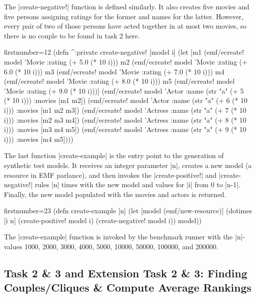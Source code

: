 \documentclass[a4paper]{article}
\newcommand{\code}{\clojureinline}
\begin{document}
The \code|create-negative!| function is defined similarly.  It also creates
five movies and five persons assigning ratings for the former and names for the
latter.  However, every pair of two of those persons have acted together in at
most two movies, so there is no couple to be found in task 2 here.

\begin{clojurecode*}{firstnumber=12}
(defn ^:private create-negative! [model i]
  (let [m1 (emf/ecreate! model 'Movie :rating (+ 5.0 (* 10 i)))
        m2 (emf/ecreate! model 'Movie :rating (+ 6.0 (* 10 i)))
        m3 (emf/ecreate! model 'Movie :rating (+ 7.0 (* 10 i)))
        m4 (emf/ecreate! model 'Movie :rating (+ 8.0 (* 10 i)))
        m5 (emf/ecreate! model 'Movie :rating (+ 9.0 (* 10 i)))]
    (emf/ecreate! model 'Actor   :name (str "a" (+ 5 (* 10 i))) :movies [m1 m2])
    (emf/ecreate! model 'Actor   :name (str "a" (+ 6 (* 10 i))) :movies [m1 m2 m3])
    (emf/ecreate! model 'Actress :name (str "a" (+ 7 (* 10 i))) :movies [m2 m3 m4])
    (emf/ecreate! model 'Actress :name (str "a" (+ 8 (* 10 i))) :movies [m3 m4 m5])
    (emf/ecreate! model 'Actress :name (str "a" (+ 9 (* 10 i))) :movies [m4 m5])))
\end{clojurecode*}

The last function \code|create-example| is the entry point to the generation of
synthetic test models.  It receives an integer parameter \code|n|, creates a
new model (a resource in EMF parlance), and then invokes the
\code|create-positive!| and \code|create-negative!| rules \code|n| times with
the new model and values for \code|i| from 0 to \code|n-1|.  Finally, the new
model populated with the movies and actors is returned.

\begin{clojurecode*}{firstnumber=23}
(defn create-example [n]
  (let [model (emf/new-resource)]
    (dotimes [i n]
      (create-positive! model i)
      (create-negative! model i))
    model))
\end{clojurecode*}

The \code|create-example| function is invoked by the benchmark runner with the
\code|n|-values 1000, 2000, 3000, 4000, 5000, 10000, 50000, 100000, and 200000.

\subsection{Task 2 \& 3 and Extension Task 2 \& 3: Finding Couples/Cliques \&
  Compute Average Rankings}
\label{sec:task-2:finding-groups}
\end{document}
